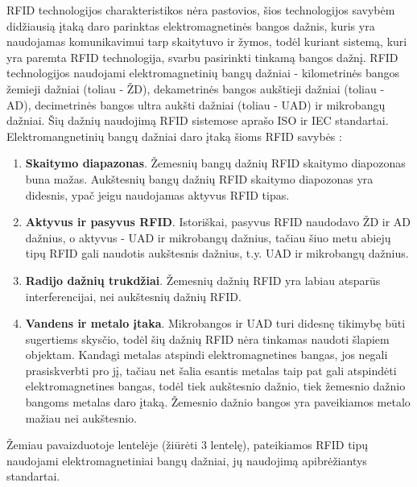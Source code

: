RFID technologijos charakteristikos nėra pastovios, šios technologijos savybėm didžiausią įtaką daro parinktas elektromagnetinės bangos dažnis, kuris yra naudojamas komunikavimui tarp skaitytuvo ir žymos, todėl kuriant sistemą, kuri yra paremta RFID technologija, svarbu pasirinkti tinkamą bangos dažnį. RFID technologijos naudojami elektromagnetinių bangų dažniai - kilometrinės bangos žemieji dažniai (toliau - ŽD), dekametrinės bangos aukštieji dažniai  (toliau - AD), decimetrinės bangos ultra aukšti dažniai (toliau - UAD) ir mikrobangų dažniai. Šių dažnių naudojimą RFID sistemose aprašo ISO ir IEC standartai. Elektromangnetinių bangų dažniai daro įtaką šioms RFID savybės \cite{Hunt2006}:
\begin{enumerate}
    \item \textbf{Skaitymo diapazonas}. Žemesnių bangų dažnių RFID skaitymo diapozonas buna mažas. Aukštesnių bangų dažnių RFID skaitymo diapozonas yra didesnis, ypač jeigu naudojamas aktyvus RFID tipas.
    \item \textbf{Aktyvus ir pasyvus RFID}. Istoriškai, pasyvus RFID naudodavo ŽD ir AD dažnius, o aktyvus - UAD ir mikrobangų dažnius, tačiau šiuo metu abiejų tipų RFID gali naudotis aukštesnis dažnius, t.y. UAD ir mikrobangų dažnius.
    \item \textbf{Radijo dažnių trukdžiai}. Žemesnių dažnių RFID yra labiau atsparūs interferencijai, nei aukštesnių dažnių RFID.
    \item \textbf{Vandens ir metalo įtaka}. Mikrobangos ir UAD turi didesnę tikimybę būti sugertiems skysčio, todėl šių dažnių RFID nėra tinkamas naudoti šlapiem objektam. Kandagi metalas atspindi elektromagnetines bangas, jos negali prasiskverbti pro jį, tačiau net šalia esantis metalas taip pat gali atspindėti elektromagnetines bangas, todėl tiek aukštesnio dažnio, tiek žemesnio dažnio bangoms metalas daro įtaką. Žemesnio dažnio bangos yra paveikiamos metalo mažiau nei aukštesnio.
\end{enumerate}
Žemiau pavaizduotoje lentelėje (žiūrėti 3 lentelę), pateikiamos RFID tipų naudojami elektromagnetiniai bangų dažniai, jų naudojimą apibrėžiantys standartai\cite{Caglar2016}.

